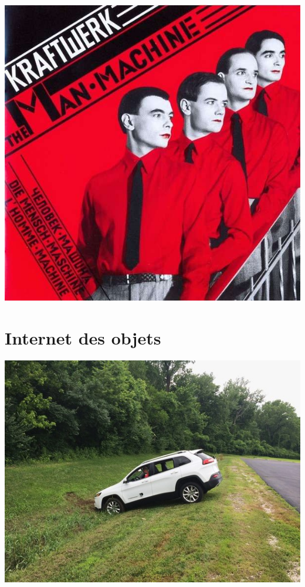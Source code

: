 \documentclass[french]{beamer}
\begin{document}
\begin{frame}
   \begin{center}
\includegraphics[height=.8\textheight]{./manmachine.jpeg}
\end{center}
\end{frame}




\section{Internet des objets}


\begin{frame}
   \begin{center}
\includegraphics[height=.8\textheight]{jeep.jpg}
\end{center}
\end{frame}
\end{document}
